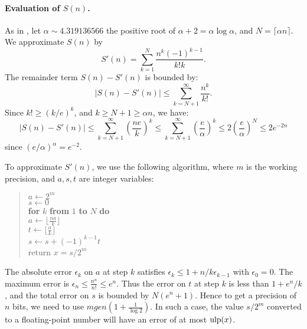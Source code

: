 \documentclass[12pt]{amsart}
\def\q{\hspace*{5mm}}
\def\ulp{{\rm ulp}}
\begin{document}
\paragraph{Evaluation of $S(n)$.}
As in \cite{Brent78}, let $\alpha \sim 4.319136566$ the positive root
of $\alpha + 2 = \alpha \log \alpha$, and $N = \lceil \alpha n \rceil$.
We approximate $S(n)$ by
\[ S'(n) = \sum_{k=1}^{N} \frac{n^k (-1)^{k-1}}{k! k}. \]
The remainder term $S(n) - S'(n)$ is bounded by:
\[ |S(n) - S'(n)| \le \sum_{k=N+1}^{\infty} \frac{n^k}{k!}. \]
Since $k! \ge (k/e)^k$, and $k \ge N+1 \ge \alpha n$, we have:
\[ |S(n) - S'(n)| \le \sum_{k=N+1}^{\infty} \left( \frac{n e}{k} \right)^k
                  \le \sum_{k=N+1}^{\infty} \left( \frac{e}{\alpha} \right)^k
                  \le 2 \left( \frac{e}{\alpha} \right)^N
                  \le 2 e^{-2n} \]
since $(e/\alpha)^{\alpha} = e^{-2}$.

To approximate $S'(n)$, we use the following algorithm, where $m$ is the
working precision, and $a, s, t$ are integer variables:
\begin{quote}
$a \leftarrow 2^m$ \\
$s \leftarrow 0$ \\
{\bf for} $k$ {\bf from} $1$ {\bf to} $N$ {\bf do} \\
\q $a \leftarrow \lfloor \frac{n a}{k} \rfloor$ \\
\q $t \leftarrow \lfloor \frac{a}{k} \rfloor$ \\
\q $s \leftarrow s + (-1)^{k-1} t$ \\
return $x = s/2^m$
\end{quote}
The absolute error $\epsilon_k$ on $a$ at step $k$ satisfies
$\epsilon_k \le 1 + n/k \epsilon_{k-1}$ with $\epsilon_0=0$.
The maximum error is $\epsilon_n \le \frac{n^n}{n!} \le e^n$.
Thus the error on $t$ at step $k$ is less than $1 + e^n/k$,
and the total error on $s$ is bounded by $N (e^n + 1)$.
Hence to get a precision of $n$ bits, we need to use
$m ge n (1 + \frac{1}{\log 2})$.
In such a case, the value $s/2^m$ converted to a floating-point number
will have an error of at most $\ulp(x)$.
\end{document}
